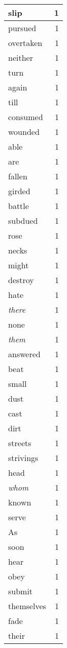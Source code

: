 \begin{center}
\begin{longtable}{l|r}
slip & 1 \\ \hline
pursued & 1 \\ \hline
overtaken & 1 \\ \hline
neither & 1 \\ \hline
turn & 1 \\ \hline
again & 1 \\ \hline
till & 1 \\ \hline
consumed & 1 \\ \hline
wounded & 1 \\ \hline
able & 1 \\ \hline
are & 1 \\ \hline
fallen & 1 \\ \hline
girded & 1 \\ \hline
battle & 1 \\ \hline
subdued & 1 \\ \hline
rose & 1 \\ \hline
necks & 1 \\ \hline
might & 1 \\ \hline
destroy & 1 \\ \hline
hate & 1 \\ \hline
\emph{there} & 1 \\ \hline
none & 1 \\ \hline
\emph{them} & 1 \\ \hline
answered & 1 \\ \hline
beat & 1 \\ \hline
small & 1 \\ \hline
dust & 1 \\ \hline
cast & 1 \\ \hline
dirt & 1 \\ \hline
streets & 1 \\ \hline
strivings & 1 \\ \hline
head & 1 \\ \hline
\emph{whom} & 1 \\ \hline
known & 1 \\ \hline
serve & 1 \\ \hline
As & 1 \\ \hline
soon & 1 \\ \hline
hear & 1 \\ \hline
obey & 1 \\ \hline
submit & 1 \\ \hline
themselves & 1 \\ \hline
fade & 1 \\ \hline
their & 1 \\ \hline

\end{longtable}
\end{center}
